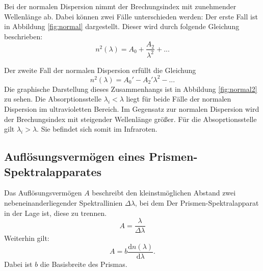 Bei der normalen Dispersion nimmt der Brechungsindex mit zunehmender Wellenlänge ab. Dabei können zwei Fälle unterschieden werden:
Der erste Fall ist in Abbildung \ref{fig:normal} dargestellt. Dieser wird durch folgende Gleichung beschrieben:
\begin{equation}
  \label{eqn:normal1}
  n^2(\lambda)=A_0+\frac{A_2}{\lambda^2}+...
\end{equation}

Der zweite Fall der normalen Dispersion erfüllt die Gleichung
\begin{equation}
  \label{eqn:normal2}
  n^2(\lambda)=A_0'-A_2'\lambda^2-...
\end{equation}
Die graphische Darstellung dieses Zusammenhangs ist in Abbildung \ref{fig:normal2} zu sehen.
Die Absorptionsstelle $\lambda_i < \lambda$ liegt für beide Fälle der normalen Dispersion im ultravioletten Bereich.
Im Gegensatz zur normalen Dispersion wird der Brechungsindex mit steigender Wellenlänge größer.
Für die Absoprtionsstelle gilt $\lambda_i>\lambda$. Sie befindet sich somit im Infraroten.

\subsection{Auflösungsvermögen eines Prismen-Spektralapparates}
Das Auflösungsvermögen $A$ beschreibt den kleinstmöglichen Abstand zwei nebeneinanderliegender Spektrallinien $\Delta \lambda$, bei dem Der Prismen-Spektralapparat in der Lage ist, diese zu trennen.
\begin{equation}
  \label{eqn:A1}
  A=\frac{\lambda}{\Delta \lambda}
\end{equation}
Weiterhin gilt:
\begin{equation}
  \label{eqn:A2}
 A=b \frac{\mathrm{d}n(\lambda)}{\mathrm{d}\lambda}.
\end{equation}
Dabei ist $b$ die Basisbreite des Prismas.
